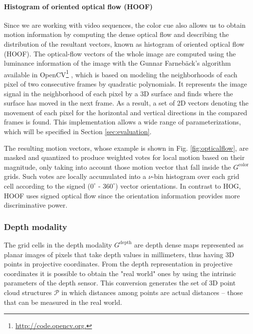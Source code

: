 \documentclass[10pt,twocolumn,letterpaper]{article}
\begin{document}
\paragraph{Histogram of oriented optical flow (HOOF)} 
Since we are working with video sequences, the color cue also allows us to obtain motion information by computing the dense optical flow and describing the distribution of the resultant vectors, known as histogram of oriented optical flow (HOOF)\cite{dalal2006human}. The optical-flow vectors of the whole image are computed using the luminance information of the image with the Gunnar Farneb\"{a}ck's algorithm \cite{farneback2003two} available in OpenCV\footnote{\url{http://code.opencv.org.}} \cite{bradski2008learning}, which is based on modeling the neighborhoods of each pixel of two consecutive frames by quadratic polynomials. It represents the image signal in the neighborhood of each pixel by a 3D surface and finds where the surface has moved in the next frame. As a result, a set of 2D vectors denoting the movement of each pixel for the horizontal and vertical directions in the compared frames is found. This implementation allows a wide range of parameterizations, which will be specified in Section \ref{sec:evaluation}.

 The resulting motion vectors, whose example is shown in Fig. \ref{fig:opticalflow}, are masked and quantized to produce weighted votes for local motion based on their magnitude, only taking into account those motion vector that fall inside the $G^\mathrm{color}$ grids. Such votes are locally accumulated into a $\nu$-bin histogram over each grid cell according to the signed ($0^\circ$ - $360^\circ$) vector orientations. In contrast to HOG, HOOF uses signed optical flow since the orientation information provides more discriminative power. 
 

\subsubsection{Depth modality}
\label{sssec:depth}

The grid cells in the depth modality $G^\mathrm{depth}$ are depth dense maps represented as planar images of pixels that take depth values in millimeters, thus having 3D points in projective coordinates. From the depth representation in projective coordinates it is possible to obtain the "real world" ones by using the intrinsic parameters of the depth sensor. This conversion generates the set of 3D point cloud structures $\mathcal{P}$ in which distances among points are actual distances -- those that can be measured in the real world. 
\end{document}
